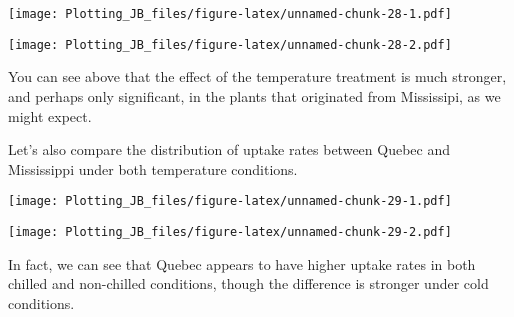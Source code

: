 \documentclass[]{article}
\newenvironment{Shaded}{\begin{snugshade}}{\end{snugshade}}
\newcommand{\DataTypeTok}[1]{\textcolor[rgb]{0.13,0.29,0.53}{#1}}
\newcommand{\KeywordTok}[1]{\textcolor[rgb]{0.13,0.29,0.53}{\textbf{#1}}}
\newcommand{\NormalTok}[1]{#1}
\newcommand{\OperatorTok}[1]{\textcolor[rgb]{0.81,0.36,0.00}{\textbf{#1}}}
\newcommand{\StringTok}[1]{\textcolor[rgb]{0.31,0.60,0.02}{#1}}
\begin{document}
\texttt{[image: Plotting\_JB\_files/figure-latex/unnamed-chunk-28-1.pdf]}

\begin{Shaded}
\end{Shaded}

\texttt{[image: Plotting\_JB\_files/figure-latex/unnamed-chunk-28-2.pdf]}

You can see above that the effect of the temperature treatment is much
stronger, and perhaps only significant, in the plants that originated
from Mississipi, as we might expect.

Let's also compare the distribution of uptake rates between Quebec and
Mississippi under both temperature conditions.

\begin{Shaded}
\end{Shaded}

\texttt{[image: Plotting\_JB\_files/figure-latex/unnamed-chunk-29-1.pdf]}

\begin{Shaded}
\end{Shaded}

\texttt{[image: Plotting\_JB\_files/figure-latex/unnamed-chunk-29-2.pdf]}

In fact, we can see that Quebec appears to have higher uptake rates in
both chilled and non-chilled conditions, though the difference is
stronger under cold conditions.
\end{document}
